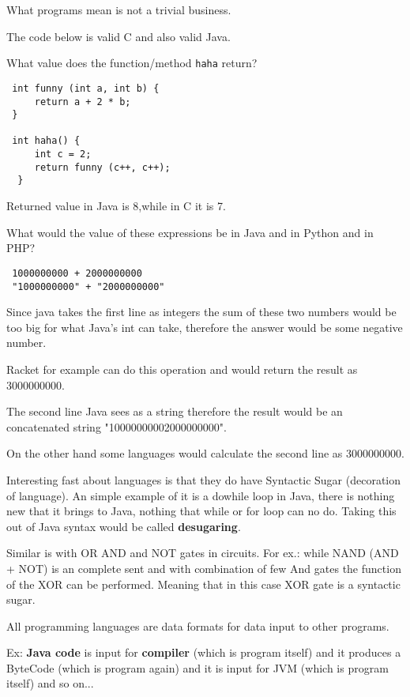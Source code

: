 \documentclass{article}
\begin{document}
\begin{flushleft}
What programs mean is not a trivial business.

The code below is valid C and also valid Java.

What value does the function/method \verb|haha| return?

\begin{verbatim}
 int funny (int a, int b) {
     return a + 2 * b;
 }
 
 int haha() {
     int c = 2;
     return funny (c++, c++);
  }
\end{verbatim}

Returned value in Java is 8,while in C it is 7.

What would the value of these expressions be in Java and in Python and in PHP?
\begin{verbatim}
 1000000000 + 2000000000
 "1000000000" + "2000000000"
\end{verbatim}

Since java takes the first line as integers the sum of these two numbers would be too big for what Java's int can take, therefore the answer would be some negative number.

Racket for example can do this operation and would return the result as 3000000000.


The second line Java sees as a string therefore the result would be an concatenated string "10000000002000000000".

On the other hand some languages would calculate the second line as 3000000000.
\setlength{\parindent}{10ex}

\par Interesting fast about languages is that they do have Syntactic Sugar (decoration of language). An simple example of it is a dowhile loop in Java, there is nothing new that it brings to Java, nothing that while or for loop can no do. Taking this out of Java syntax would be called \textbf{desugaring}.

\noindent
Similar is with OR AND and NOT gates in circuits. For ex.: while NAND (AND + NOT) is an complete sent and with combination of few And gates the function of the XOR can be performed. Meaning that in this case XOR gate is a syntactic sugar.

All programming languages are data formats for data input to other programs.

\noindent
Ex: \textbf{Java code} is input for \textbf{compiler} (which is program itself) and it produces a ByteCode (which is program again) and it is input for JVM (which is program itself) and so on...


\end{flushleft}
\end{document}
